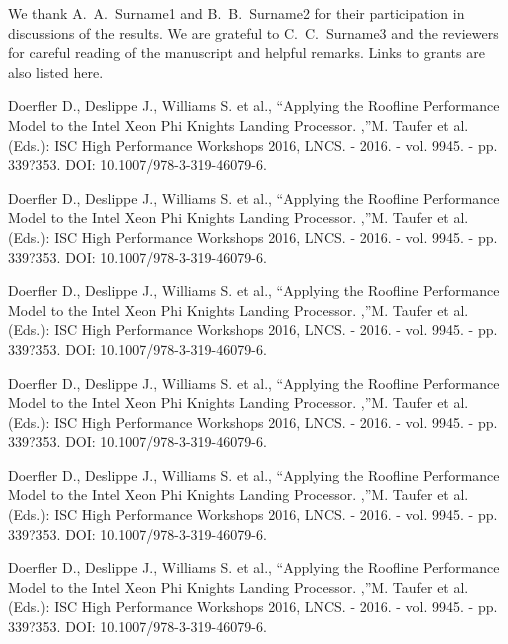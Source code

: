 \documentclass[
11pt,%
tightenlines,%
twoside,%
onecolumn,%
nofloats,%
nobibnotes,%
nofootinbib,%
superscriptaddress,%
noshowpacs,%
centertags]%
{revtex4}
\begin{document}
\begin{acknowledgments}
We thank A.~A.~Surname1 and B.~B.~Surname2 for their participation in discussions of the results. We are grateful to C.~C.~Surname3 and the reviewers for careful reading of the manuscript and helpful remarks. Links to grants are also listed here.
\end{acknowledgments}

\begin{thebibliography}{99}

Doerfler D., Deslippe J., Williams S. et al., \textquotedblleft Applying the Roofline Performance Model to the Intel Xeon Phi Knights Landing Processor. ,\textquotedblright M. Taufer et al. (Eds.): ISC High Performance Workshops 2016, LNCS. - 2016. - vol. 9945. - pp. 339?353. DOI: 10.1007/978-3-319-46079-6.

Doerfler D., Deslippe J., Williams S. et al., \textquotedblleft Applying the Roofline Performance Model to the Intel Xeon Phi Knights Landing Processor. ,\textquotedblright M. Taufer et al. (Eds.): ISC High Performance Workshops 2016, LNCS. - 2016. - vol. 9945. - pp. 339?353. DOI: 10.1007/978-3-319-46079-6.

Doerfler D., Deslippe J., Williams S. et al., \textquotedblleft Applying the Roofline Performance Model to the Intel Xeon Phi Knights Landing Processor. ,\textquotedblright M. Taufer et al. (Eds.): ISC High Performance Workshops 2016, LNCS. - 2016. - vol. 9945. - pp. 339?353. DOI: 10.1007/978-3-319-46079-6.

Doerfler D., Deslippe J., Williams S. et al., \textquotedblleft Applying the Roofline Performance Model to the Intel Xeon Phi Knights Landing Processor. ,\textquotedblright M. Taufer et al. (Eds.): ISC High Performance Workshops 2016, LNCS. - 2016. - vol. 9945. - pp. 339?353. DOI: 10.1007/978-3-319-46079-6.

Doerfler D., Deslippe J., Williams S. et al., \textquotedblleft Applying the Roofline Performance Model to the Intel Xeon Phi Knights Landing Processor. ,\textquotedblright M. Taufer et al. (Eds.): ISC High Performance Workshops 2016, LNCS. - 2016. - vol. 9945. - pp. 339?353. DOI: 10.1007/978-3-319-46079-6.

Doerfler D., Deslippe J., Williams S. et al., \textquotedblleft Applying the Roofline Performance Model to the Intel Xeon Phi Knights Landing Processor. ,\textquotedblright M. Taufer et al. (Eds.): ISC High Performance Workshops 2016, LNCS. - 2016. - vol. 9945. - pp. 339?353. DOI: 10.1007/978-3-319-46079-6.


\end{thebibliography}
\end{document}
